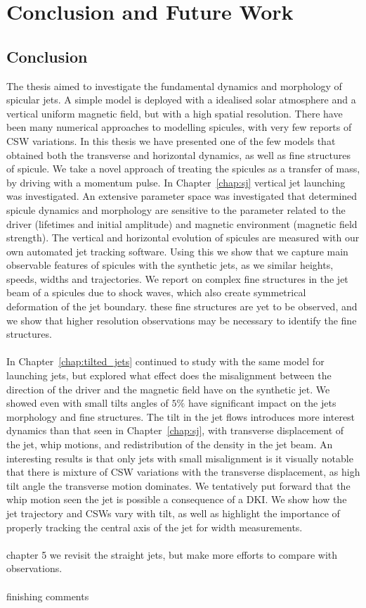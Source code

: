 \documentclass[12pt]{ociamthesis}
\newcommand{\np}{\\ \\}
\begin{document}
\baselineskip=18pt


\chapter{Conclusion and Future Work}
\label{chap:con_and_fut_work}
\section{Conclusion}
\label{sec:con}
The thesis aimed to investigate the fundamental dynamics and morphology of spicular jets. A simple model is deployed with a idealised solar atmosphere and a vertical uniform magnetic field, but with a high spatial resolution. There have been many numerical approaches to modelling spicules, with very few reports of CSW variations. In this thesis we have presented one of the few models that obtained both the transverse and horizontal dynamics, as well as fine structures of spicule. We take a novel approach of treating the spicules as a transfer of mass, by driving with a momentum pulse. In Chapter~\ref{chap:sj} vertical jet launching was investigated. An extensive parameter space was investigated that determined spicule dynamics and morphology are sensitive to the parameter related to the driver (lifetimes and initial amplitude) and magnetic environment (magnetic field strength). The vertical and horizontal evolution of spicules are measured  with our own automated jet tracking software. Using this we show that we capture main observable features of spicules with the synthetic jets, as we similar heights, speeds, widths and trajectories. We report on complex fine structures in the jet beam of a spicules due to shock waves, which also create symmetrical deformation of the jet boundary. these fine structures are yet to be observed, and we show that higher resolution observations may be necessary to identify the fine structures. \np
%
In Chapter~\ref{chap:tilted_jets} continued to study with the same model for launching jets, but explored what effect does the misalignment between the direction of the driver and the magnetic field have on the synthetic jet. We showed even with small tilts angles of $5\%$ have significant impact on the jets morphology and fine structures. The tilt in the jet flows introduces more interest dynamics than that seen in Chapter~\ref{chap:sj}, with transverse displacement of the jet, whip motions, and redistribution of the density in the jet beam. An interesting results is that only jets with small misalignment is it visually notable that there is mixture of CSW variations with the transverse displacement, as high tilt angle the transverse motion dominates. We tentatively put forward that the whip motion seen the jet is possible a consequence of a DKI. We show how the jet trajectory and CSWs vary with tilt, as well as highlight the importance of properly tracking the central axis of the jet for width measurements. \np
%
chapter 5 we revisit the straight jets, but make more efforts to compare with observations. \np
%
finishing comments
\end{document}
